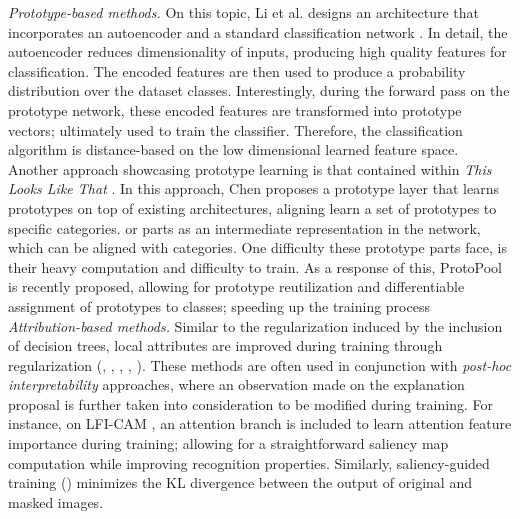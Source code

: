 \noindent \emph{Prototype-based methods.} On this topic, Li et al. designs an architecture that 
incorporates an autoencoder and a standard classification network \autocite{li2018deep}. 
In detail, the autoencoder reduces dimensionality of inputs, producing high quality features for 
classification. The encoded features are then used to produce a probability distribution over the 
dataset classes. Interestingly, during the forward pass on the prototype network, these encoded 
features are transformed into prototype vectors; ultimately used to train the classifier. Therefore, 
the classification algorithm is distance-based on the low dimensional learned feature space. 
Another approach showcasing prototype learning is that contained within \emph{This Looks Like That} 
\autocite{chen2019looks}. In this approach, Chen proposes a prototype layer that learns prototypes 
on top of existing architectures, aligning learn a set of prototypes to specific categories. 
or parts as an intermediate representation in the network, which can be aligned with categories.
One difficulty these prototype parts face, is their heavy computation and difficulty to 
train. As a response of this, ProtoPool \autocite{rymarczyk2022interpretable} is recently proposed, 
allowing for prototype reutilization and differentiable assignment of prototypes to classes; 
speeding up the training process\\

\noindent \emph{Attribution-based methods.} Similar to the regularization induced by the inclusion 
of decision trees, local attributes are improved during training through regularization 
(\cite{ismail2021improving}, \cite{Zhou_2022_BMVC}, \cite{ross2017right}, 
\cite{ghaeini2019saliency}, \cite{lee2021lfi}). These methods are often used in conjunction with 
\emph{post-hoc interpretability} approaches, where an observation made on the explanation proposal 
is further taken into consideration to be modified during training. For instance, on LFI-CAM 
\autocite{lee2021lfi},  an attention branch is included to learn attention feature importance 
during training; allowing for a straightforward saliency map computation while improving 
recognition properties. Similarly, saliency-guided training (\cite{ismail2021improving}) 
minimizes the KL divergence between the output of original and masked images. \\


